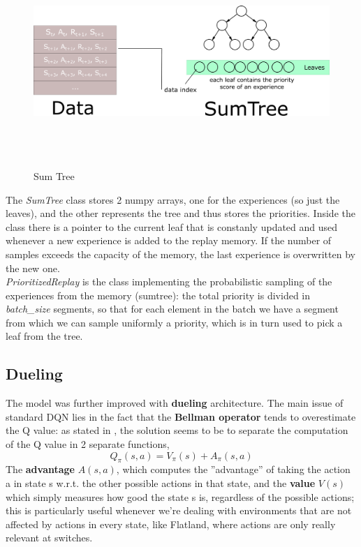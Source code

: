  \begin{figure}[H] 
\includegraphics[height=80mm, width=140mm, scale=0.5]{chapters/SumTree.png}
\centering
\caption{Sum Tree}
\label{fig:s4} 
\end{figure}
\noindent
The \textit{SumTree} class stores 2 numpy arrays, one for the experiences (so just the leaves), and the other represents the tree and thus stores the priorities. Inside the class there is a pointer to the current leaf that is constanly updated and used whenever a new experience is added to the replay memory. If the number of samples exceeds the capacity of the memory, the last experience is overwritten by the new one. \\
\textit{PrioritizedReplay} is the class implementing the probabilistic sampling of the experiences from the memory (sumtree): the total priority is divided in \textit{batch\_size} segments, so that for each element in the batch we have a segment from which we can sample uniformly a priority, which is in turn used to pick a leaf from the tree. 	

\subsection{Dueling}

The model was further improved with \textbf{dueling} architecture. The main issue of standard DQN lies in the fact that the \textbf{Bellman operator} tends to overestimate the Q value: as stated in \cite{dueling}, the solution seems to be to separate the computation of the Q value in 2 separate functions, $$Q_{\pi}(s,a) = V_{\pi}(s) + A_{\pi}(s,a) $$ The \textbf{advantage} $A(s,a)$, which computes the  ''advantage'' of taking the action a in state s w.r.t. the other possible actions in that state, and the \textbf{value} $V(s)$ which simply measures how good the state s is, regardless of the possible actions; this is particularly useful whenever we're dealing with environments that are not affected by actions in every state, like Flatland, where actions are only really relevant at switches.


